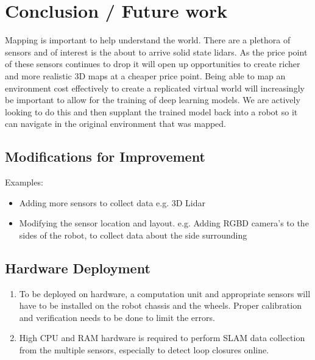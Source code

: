 \documentclass[10pt,journal,compsoc]{IEEEtran}
\begin{document}
\section{Conclusion / Future work}

Mapping is important to help understand the world. There are a plethora of sensors and of interest is the about to arrive solid state lidars. As the price point of these sensors continues to drop it will open up opportunities to create richer and more realistic 3D maps at a cheaper price point.
Being able to map an environment cost effectively to create a replicated virtual world will increasingly be important to allow for the training of deep learning models. We are actively looking to do this and then supplant the trained model back into a robot so it can navigate in the original environment that was mapped.

\subsection{Modifications for Improvement}
Examples:
\begin{itemize}
\item Adding more sensors to collect data e.g. 3D Lidar
\item Modifying the sensor location and layout. e.g. Adding RGBD camera's to the sides of the robot, to collect data about the side surrounding
\end{itemize}

\subsection{Hardware Deployment}
\begin{enumerate}
\item To be deployed on hardware, a computation unit and appropriate sensors will have to be installed on the robot chassis and the wheels. Proper calibration and verification needs to be done to limit the errors.
\item High CPU and RAM hardware is required to perform SLAM data collection from the multiple sensors, especially to detect loop closures online.
\end{enumerate}





\end{document}

